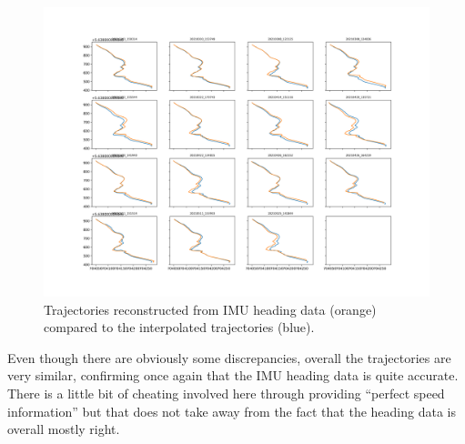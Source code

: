 \documentclass[a4]{article}
\begin{document}
\begin{figure}
  \includegraphics[width=\textwidth]{figures/reconstructed_all.png}
  \caption{\label{fig:reconstruct} Trajectories reconstructed from IMU
    heading data (orange) compared to the interpolated trajectories
    (blue).}
\end{figure}

Even though there are obviously some discrepancies, overall the
trajectories are very similar, confirming once again that the IMU
heading data is quite accurate. There is a little bit of cheating
involved here through providing ``perfect speed information'' but that
does not take away from the fact that the heading data is overall mostly right.
\end{document}
